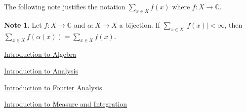 \documentclass{book}
\theoremstyle{definition}
\newtheorem{note}[definition]{Note}
\newcommand{\al}{\alpha}
\newcommand{\C}{\mathbb{C}}
\DeclareMathOperator*{\0}{\mbf{0}}
\DeclareMathOperator*{\1}{\mbf{1}}
\begin{document}
	The following note justifies the notation $\sum_{x \in X}f(x)$ where $f:X \rightarrow \C$.
	
	\begin{note}
		Let $f:X \rightarrow \C$ and $\al:X \rightarrow X$ a bijection. If $\sum_{x \in X}|f(x)|< \infty$, then $\sum_{x \in X}f( \al (x)) = \sum_{x \in X}f(x) $.
	\end{note}

	
	\backmatter
	\begin{thebibliography}{4}
	
 \href{https://github.com/carsonaj/Mathematics/blob/master/Introduction\%20to\%20Algebra/Introduction\%20to\%20Algebra.pdf}{Introduction to Algebra}

  \href{https://github.com/carsonaj/Mathematics/blob/master/Introduction\%20to\%20Analysis/Introduction\%20to\%20Analysis.pdf}{Introduction to Analysis}	

  \href{https://github.com/carsonaj/Mathematics/blob/master/Introduction\%20to\%20Fourier\%20Analysis/Introduction\%20to\%20Fourier\%20Analysis.pdf}{Introduction to Fourier Analysis}

  \href{https://github.com/carsonaj/Mathematics/blob/master/Introduction\%20to\%20Measure\%20and\%20Integration/Introduction\%20to\%20Measure\%20and\%20Integration.pdf}{Introduction to Measure and Integration}

\end{thebibliography}
	
\end{document}
